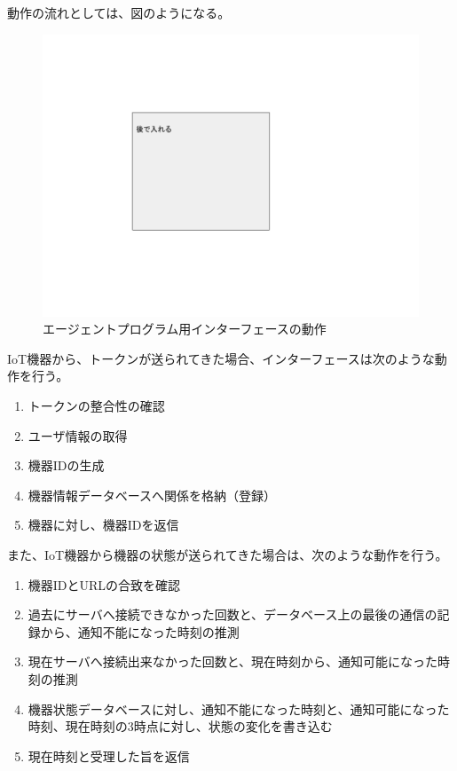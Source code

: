 動作の流れとしては、図のようになる。
\begin{figure}[htbp]
\includegraphics[width=16cm]{images/test.png}
\caption{エージェントプログラム用インターフェースの動作}
\label{fig:interface_flow}
\end{figure}
IoT機器から、トークンが送られてきた場合、インターフェースは次のような動作を行う。
\begin{enumerate}
\item トークンの整合性の確認
\item ユーザ情報の取得
\item 機器IDの生成
\item 機器情報データベースへ関係を格納（登録）
\item 機器に対し、機器IDを返信
\end{enumerate}

また、IoT機器から機器の状態が送られてきた場合は、次のような動作を行う。
\begin{enumerate}
\item 機器IDとURLの合致を確認
\item 過去にサーバへ接続できなかった回数と、データベース上の最後の通信の記録から、通知不能になった時刻の推測
\item 現在サーバへ接続出来なかった回数と、現在時刻から、通知可能になった時刻の推測
\item 機器状態データベースに対し、通知不能になった時刻と、通知可能になった時刻、現在時刻の3時点に対し、状態の変化を書き込む
\item 現在時刻と受理した旨を返信
\end{enumerate}

